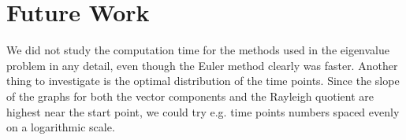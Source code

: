 \section{Future Work}\label{sec:Future}

We did not study the computation time for the methods used in the eigenvalue problem in any detail, even though the Euler method clearly was faster. Another thing to investigate is the optimal distribution of the time points. Since the slope of the graphs for both the vector components and the Rayleigh quotient are highest near the start point, we could try e.g. time points numbers spaced evenly on a logarithmic scale.